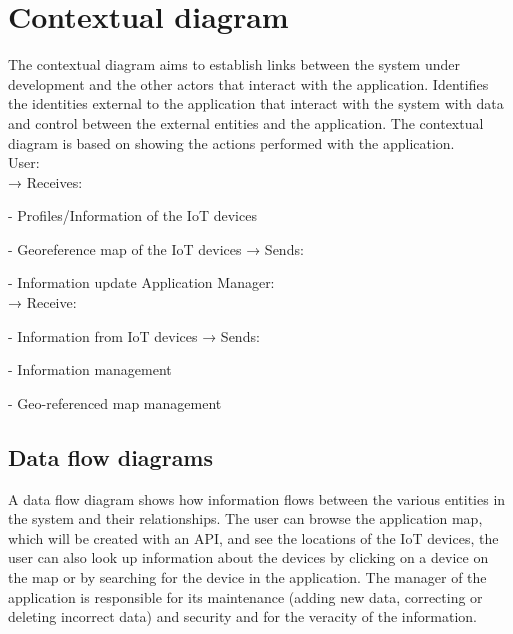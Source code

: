 \documentclass{scrreprt}
\begin{document}
\chapter{Contextual diagram}

The contextual diagram aims to establish links between the system under
development and the other actors that interact with the application.
\newline
Identifies the identities external to the application that interact with
the system with data and control between the external entities and the application.
The contextual diagram is based on showing the actions performed with the
application. \\
\newline
User: \\
\newline
→ Receives:

- Profiles/Information of the IoT devices

- Georeference map of the IoT devices
\newline
→ Sends:

- Information update \newline
\newline
Application Manager: \\
\newline
→ Receive:

- Information from IoT devices
\newline
→ Sends:

- Information management

- Geo-referenced map management

\section{Data flow diagrams}

A data flow diagram shows how information flows between the various entities
in the system and their relationships.
The user can browse the application map, which will be created with an API,
and see the locations of the IoT devices, the user can also look up information
about the devices by clicking on a device on the map or by searching for
the device in the application. The manager of the application is responsible for
its maintenance (adding new data, correcting or deleting incorrect data)
and security and for the veracity of the information.
\end{document}
